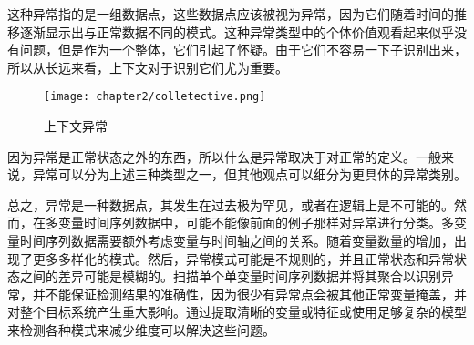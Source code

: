 这种异常指的是一组数据点，这些数据点应该被视为异常，因为它们随着时间的推移逐渐显示出与正常数据不同的模式。这种异常类型中的个体价值观看起来似乎没有问题，但是作为一个整体，它们引起了怀疑。由于它们不容易一下子识别出来，所以从长远来看，上下文对于识别它们尤为重要。
\begin{figure}[ht]
    \centering
    \texttt{[image: chapter2/colletective.png]}
    \caption{上下文异常}
    \end{figure}

因为异常是正常状态之外的东西，所以什么是异常取决于对正常的定义。一般来说，异常可以分为上述三种类型之一，但其他观点可以细分为更具体的异常类别。

总之，异常是一种数据点，其发生在过去极为罕见，或者在逻辑上是不可能的。然而，在多变量时间序列数据中，可能不能像前面的例子那样对异常进行分类。多变量时间序列数据需要额外考虑变量与时间轴之间的关系。随着变量数量的增加，出现了更多多样化的模式。然后，异常模式可能是不规则的，并且正常状态和异常状态之间的差异可能是模糊的。扫描单个单变量时间序列数据并将其聚合以识别异常，并不能保证检测结果的准确性，因为很少有异常点会被其他正常变量掩盖，并对整个目标系统产生重大影响。通过提取清晰的变量或特征或使用足够复杂的模型来检测各种模式来减少维度可以解决这些问题。

\begin{figure}[htbp]
    \centering
    \centering
    \end{figure}

